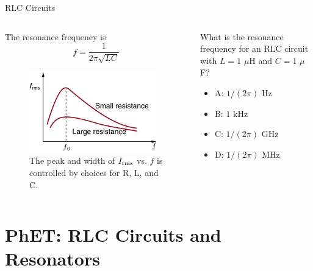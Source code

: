 \documentclass{beamer}
\begin{document}
\begin{frame}{RLC Circuits}
\begin{columns}[T]
\begin{column}{0.5\textwidth}
The resonance frequency is
\begin{equation}
f = \frac{1}{2\pi\sqrt{LC}}
\end{equation}
\begin{figure}
\centering
\includegraphics[width=0.95\textwidth]{figures/resonance.png}
\caption{\label{fig:resonance} The peak and width of $I_{\rm rms}$ vs. $f$ is controlled by choices for R, L, and C.}
\end{figure}
\end{column}
\begin{column}{0.5\textwidth}
What is the resonance frequency for an RLC circuit with $L = 1$ $\mu$H and $C = 1$ $\mu$F?
\begin{itemize}
\item A: $1/(2\pi)$ Hz
\item B: $1$ kHz
\item C: $1/(2\pi)$ GHz
\item D: $1/(2\pi)$ MHz
\end{itemize}
\end{column}
\end{columns}
\end{frame}

\section{PhET: RLC Circuits and Resonators}
\end{document}
